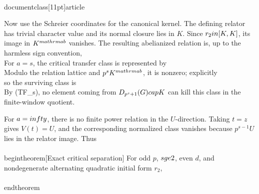 \\documentclass[11pt]{article}
\begin{document}
Now use the Schreier coordinates for the canonical kernel. The defining relator has trivial character value and its normal closure lies in $K$. Since $r_2\\in[K,K]$, its image in $K^{\\mathrm{ab}}$ vanishes. The resulting abelianized relation is, up to the harmless sign convention,
\\[
p^{s-1}U-p^aA_1=0.
\\tag{L}
\\]
For $a=s$, the critical transfer class is represented by
\\[
p^{s-1}(\\sigma-1)^{p-1}A_0.
\\]
Modulo the relation lattice and $p^sK^{\\mathrm{ab}}$, it is nonzero; explicitly
\\[
(\\sigma-1)^{p-1}A_0\\equiv\\sum_jA_j\\pmod p,
\\]
so the surviving class is
\\[
p^{s-1}\\sum_jA_j\\ne0.
\\]
By (TF_s), no element coming from $D_{p^s+1}(G)\\cap K$ can kill this class in the finite-window quotient.

For $a=\\infty$, there is no finite power relation in the $U$-direction. Taking $t=z$ gives $V(t)=U$, and the corresponding normalized class vanishes because $p^{s-1}U$ lies in the relator image. Thus
\\[
\\eps_s(W_{p^s+1}(G_{s,s}))\\ne0,
\\qquad
\\eps_s(W_{p^s+1}(G_{s,\\infty}))=0.
\\tag{E}
\\]

\\begin{theorem}[Exact critical separation]
For odd $p$, $s\\ge2$, even $d$, and nondegenerate alternating quadratic initial form $r_2$,
\\[
\\boxed{
W_{p^s+1}(G_{s,s})
\\not\\cong
W_{p^s+1}(G_{s,\\infty}).
}
\\]
\\end{theorem}
\end{document}
